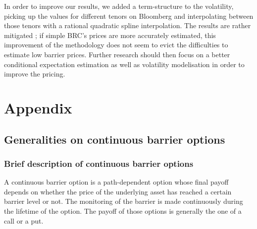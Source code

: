 \documentclass[a4paper,11pt,english]{book}
\let\cleardoublepage\clearpage
\begin{document}
In order to improve our results, we added a term-structure to the volatility, picking up the values for different tenors on Bloomberg and interpolating between those tenors with a rational quadratic spline interpolation. The results are rather mitigated ; if simple BRC's prices are more accurately estimated, this improvement of the methodology does not seem to evict the difficulties to estimate low barrier prices. Further research should then focus on a better conditional expectation estimation as well as volatility modelisation in order to improve the pricing.




\newpage
\nocite{*}






\newpage
\begingroup
\let\clearpage\relax
\let\cleardoublepage\relax


\renewcommand{\thesection}{\Alph{section}}
\chapter*{Appendix}
\appendix
{}

\section{Generalities on continuous barrier options}
\label{appendix:down-in-put}

\subsection{Brief description of continuous barrier options}
A continuous barrier option is a path-dependent option whose final payoff depends on whether the price of the underlying asset has reached a certain barrier level or not. The monitoring of the barrier is made continuously during the lifetime of the option. The payoff of those options is generally the one of a call or a put.\\
\end{document}
